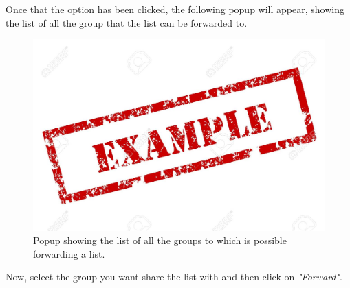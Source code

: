 Once that the option has been clicked, the following popup will appear, showing the list of all the group that the list can be forwarded to.

\begin{figure}[H]
  \centering 
  \includegraphics[width=\textwidth]{Sections/3-HowToUse/Images/example.jpeg}
  \caption{Popup showing the list of all the groups to which is possible forwarding a list.}
\end{figure}

Now, select the group you want share the list with and then click on \textit{"Forward"}.
